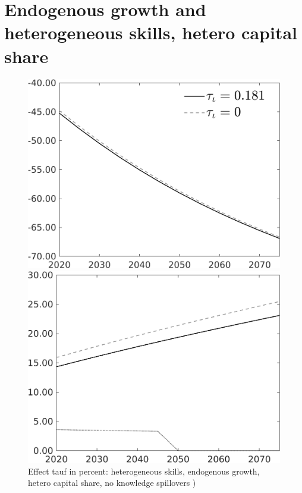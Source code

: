 \documentclass[12pt]{article}
\begin{document}
\section{Endogenous growth and heterogeneous skills, hetero capital share}
\begin{figure}[h!!]
	\centering
	\caption{Effect tauf in percent: heterogeneous skills, endogenous growth, hetero capital share, no knowledge spillovers )}\label{fig:Leveltauf_nsk0_xgr0_noknow_notaul}
	\begin{minipage}[]{0.32\textwidth}
		\includegraphics[width=1\textwidth]{../../codding_model/own_basedOnFried/optimalPol_010922_revision/figures/all_13Sept22/PerdifNoTauf_regime0_CompTaul_Emnet_spillover0_nsk0_xgr0_knspil1_sep1_LFlimit0_emsbase0_countec0_GovRev0_etaa0.79_lgd1.png}
	\end{minipage}	
	\begin{minipage}[]{0.32\textwidth}
		\includegraphics[width=1\textwidth]{../../codding_model/own_basedOnFried/optimalPol_010922_revision/figures/all_13Sept22/CompTauf_bytaul_Reg0_Emnet_spillover0_nsk0_xgr0_knspil1_sep1_LFlimit0_emsbase0_countec0_GovRev0_etaa0.79_lgd0.png}

\end{minipage}
\end{figure}
\end{document}
